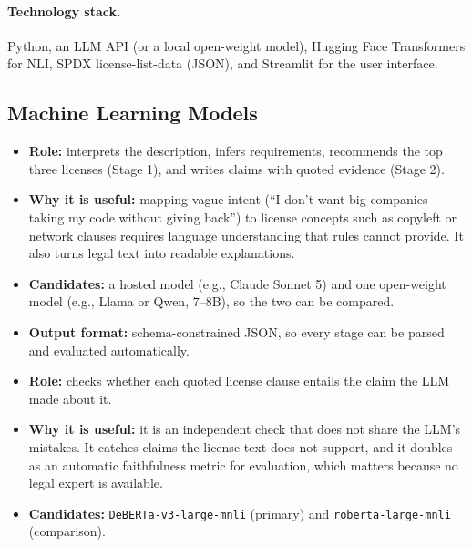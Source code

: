 \documentclass[11pt]{article}
\begin{document}
\paragraph{Technology stack.}
Python, an LLM API (or a local open-weight model), Hugging Face Transformers for NLI, SPDX license-list-data (JSON), and Streamlit for the user interface.

\subsection{Machine Learning Models}

\begin{description}[leftmargin=0pt,style=nextline]
  \item[M1 --- Large Language Model]
  \begin{itemize}
    \item \textbf{Role:} interprets the description, infers requirements, recommends the top three licenses (Stage 1), and writes claims with quoted evidence (Stage 2).
    \item \textbf{Why it is useful:} mapping vague intent (``I don't want big companies taking my code without giving back'') to license concepts such as copyleft or network clauses requires language understanding that rules cannot provide. It also turns legal text into readable explanations.
    \item \textbf{Candidates:} a hosted model (e.g., Claude Sonnet 5) and one open-weight model (e.g., Llama or Qwen, 7--8B), so the two can be compared.
    \item \textbf{Output format:} schema-constrained JSON, so every stage can be parsed and evaluated automatically.
  \end{itemize}

  \item[M2 --- Natural Language Inference (NLI) Model]
  \begin{itemize}
    \item \textbf{Role:} checks whether each quoted license clause entails the claim the LLM made about it.
    \item \textbf{Why it is useful:} it is an independent check that does not share the LLM's mistakes. It catches claims the license text does not support, and it doubles as an automatic faithfulness metric for evaluation, which matters because no legal expert is available.
    \item \textbf{Candidates:} \texttt{DeBERTa-v3-large-mnli} (primary) and \texttt{roberta-large-mnli} (comparison).
  \end{itemize}
\end{description}
\end{document}
